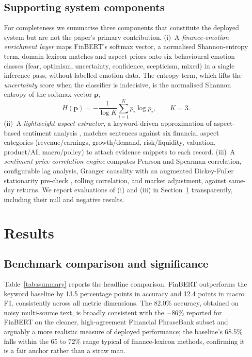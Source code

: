 \documentclass[12pt,a4paper]{article}
\begin{document}
\subsection{Supporting system components}\label{sec:supporting}
For completeness we summarise three components that constitute the deployed system
but are not the paper's primary contribution. (i)~A \emph{finance-emotion enrichment
layer} maps FinBERT's softmax vector, a normalised Shannon-entropy term, domain
lexicon matches and aspect priors onto six behavioural emotion classes (fear,
optimism, uncertainty, confidence, scepticism, mixed) in a single inference pass,
without labelled emotion data. The entropy term, which lifts the
\emph{uncertainty} score when the classifier is indecisive, is the normalised
Shannon entropy of the softmax vector $\mathbf{p}$,
\begin{equation}
H(\mathbf{p}) = -\frac{1}{\log K}\sum_{i=1}^{K} p_i \log p_i, \qquad K=3.
\end{equation}
(ii)~A \emph{lightweight aspect extractor}, a keyword-driven approximation of
aspect-based sentiment analysis \citep{pontiki2014}, matches sentences against six
financial aspect categories (revenue/earnings, growth/demand, risk/liquidity,
valuation, product/AI, macro/policy) to attach evidence snippets to each record. (iii)~A
\emph{sentiment-price correlation engine} computes Pearson and Spearman
correlation, configurable lag analysis, Granger causality \citep{granger1969} with
an augmented Dickey-Fuller stationarity pre-check \citep{dickey1979}, rolling
correlation, and market adjustment, against same-day returns. We report evaluations
of (i) and (iii) in Section~\ref{sec:results} transparently, including their null
and negative results.

\section{Results}\label{sec:results}
\subsection{Benchmark comparison and significance}
Table~\ref{tab:summary} reports the headline comparison. FinBERT outperforms the
keyword baseline by 13.5 percentage points in accuracy and 12.4 points in macro F1,
consistently across all metric dimensions. The 82.0\% accuracy, obtained on noisy
multi-source text, is broadly consistent with the $\sim$86\% reported for FinBERT on
the cleaner, high-agreement Financial PhraseBank subset \citep{araci2019,malo2014}
and arguably a more realistic measure of deployed performance; the baseline's 68.5\%
falls within the 65 to 72\% range typical of finance-lexicon methods, confirming it
is a fair anchor rather than a straw man.
\end{document}
